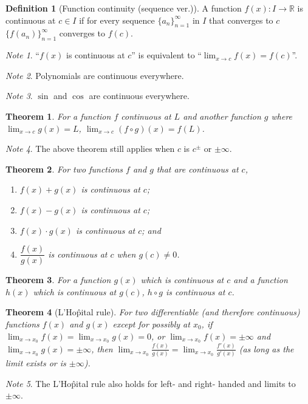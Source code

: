\documentclass{article}
\newcommand*{\R}{\mathbb{R}}
\theoremstyle{plain}
\newtheorem{theorem}{Theorem}[section]
\numberwithin{theorem}{subsection}
\theoremstyle{definition}
\newtheorem{definition}{Definition}[section]
\numberwithin{definition}{subsection}
\theoremstyle{remark}
\newtheorem{note}{Note}[section]
\numberwithin{note}{section}
\begin{document}
%
\begin{definition}[Function continuity (sequence ver.)]
    A function $f(x):I\to\R$ is continuous at $c \in I$ if
    for every sequence $\{a_n\}^{\infty}_{n=1}$ in $I$ that converges to $c$
    $\{f(a_n)\}^{\infty}_{n=1}$ converges to $f(c)$.
\end{definition}
%
\begin{note}
    ``$f(x)$ is continuous at $c$'' is equivalent to
    ``$\displaystyle \lim_{x\to c} f(x) = f(c)$''.
\end{note}
%
\begin{note}
    Polynomials are continuous everywhere.
\end{note}
%
\begin{note}
    $\sin$ and $\cos$ are continuous everywhere.
\end{note}
%
\begin{theorem}
    For a function $f$ continuous at $L$
    and another function $g$ where $\displaystyle \lim_{x\to c}g(x) = L$,
    $\displaystyle \lim_{x\to c} (f \circ g)(x) = f(L)$.
\end{theorem}
\begin{note}
    The above theorem still applies when $c$ is $c^\pm$ or $\pm\infty$.
\end{note}
%
\begin{theorem}
    For two functions $f$ and $g$ that are continuous at $c$,
    \begin{enumerate}[label=\normalfont\alph*)]
        \item $f(x) + g(x)$ is continuous at $c$;
        \item $f(x) - g(x)$ is continuous at $c$;
        \item $f(x) \cdot g(x)$ is continuous at $c$; and
        \item $\dfrac{f(x)}{g(x)}$ is continuous at $c$ when $g(c)\ne0$.
    \end{enumerate}
\end{theorem}
%
\begin{theorem}
    For a function $g(x)$ which is continuous at $c$ and
    a function $h(x)$ which is continuous at $g(c)$,
    $h \circ g$ is continuous at $c$.
\end{theorem}
%
\begin{theorem}[L'Ho\^pital rule]
    For two differentiable (and therefore continuous) functions $f(x)$ and $g(x)$
    except for possibly at $x_0$,
    if $\displaystyle \lim_{x\to x_0}f(x)=\lim_{x\to x_0}g(x)=0$,
    or $\displaystyle \lim_{x\to x_0}f(x)=\pm\infty$
        and $\displaystyle \lim_{x\to x_0}g(x)=\pm\infty$,
    then
    $\lim_{x\to x_0}\frac{f(x)}{g(x)} = \lim_{x\to x_0}\frac{f'(x)}{g'(x)}$
    (as long as the limit exists or is $\pm\infty$).
\end{theorem}
%
\begin{note}
    The L'Ho\^pital rule also holds for left- and right- handed and limits to $\pm\infty$.
\end{note}
\end{document}
